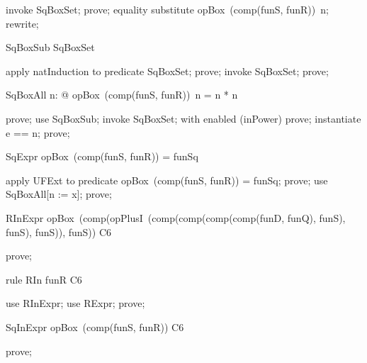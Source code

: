 \documentclass{article}
\begin{document}
\begin{zproof}
invoke SqBoxSet;
prove;
equality substitute opBox~(comp(funS, funR))~n;
rewrite;
\end{zproof}

\begin{theorem}{SqBoxSub}
  \nat \subseteq SqBoxSet
\end{theorem}

\begin{zproof}
apply natInduction to predicate \nat \subseteq SqBoxSet;
prove;
invoke SqBoxSet;
prove;
\end{zproof}

\begin{theorem}{SqBoxAll}
  \forall n: \nat @ opBox~(comp(funS, funR))~n = n * n
\end{theorem}

\begin{zproof}
prove;
use SqBoxSub;
invoke SqBoxSet;
with enabled (inPower) prove;
instantiate e == n;
prove;
\end{zproof}

\begin{theorem}{SqExpr}
  opBox~(comp(funS, funR)) = funSq
\end{theorem}

\begin{zproof}
apply UFExt to predicate opBox~(comp(funS, funR)) = funSq;
prove;
use SqBoxAll[n := x];
prove;
\end{zproof}

\begin{theorem}{RInExpr}
  opBox~(comp(opPlusI~(comp(comp(comp(comp(funD, funQ), funS), funS), funS)), funS)) \in C6
\end{theorem}

\begin{zproof}
prove;
\end{zproof}

\begin{theorem}{rule RIn}
  funR \in C6
\end{theorem}

\begin{zproof}
use RInExpr;
use RExpr;
prove;
\end{zproof}

\begin{theorem}{SqInExpr}
  opBox~(comp(funS, funR)) \in C6
\end{theorem}

\begin{zproof}
prove;
\end{zproof}
\end{document}
